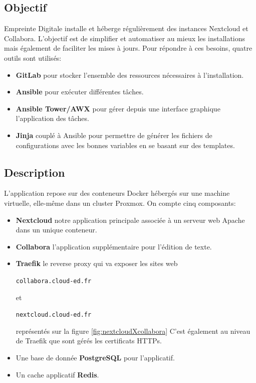 \documentclass[12pt, a4paper, twoside]{article}
\begin{document}
\subsection{Objectif}
Empreinte Digitale installe et héberge régulièrement des instances \gls{Nextcloud} et \gls{Collabora}. 
L'objectif est de simplifier et automatiser au mieux les installations mais également de faciliter les mises à jours.
Pour répondre à ces besoins, quatre outils sont utilisés:
\begin{itemize}
    \item \textbf{\gls{GitLab}} pour stocker l'ensemble des ressources nécessaires à l'installation.
    \item \textbf{\gls{Ansible}} pour exécuter différentes tâches.
    \item \textbf{\gls{Ansible} Tower/AWX} pour gérer depuis une interface graphique l'application des tâches.
    \item \textbf{\gls{Jinja}} couplé à \gls{Ansible} pour permettre de générer les fichiers de configurations avec les bonnes variables en se basant sur des templates.
\end{itemize}

\subsection{Description}
L'application repose sur des conteneurs Docker hébergés sur une machine virtuelle, elle-même dans un \gls{cluster} \gls{Proxmox}. On compte cinq composants:
\begin{itemize}
    \item \textbf{\gls{Nextcloud}} notre application principale associée à un serveur web Apache dans un unique conteneur.
    \item \textbf{\gls{Collabora}} l'application supplémentaire pour l'édition de texte.
    \item \textbf{\gls{Traefik}} le reverse proxy qui va exposer les sites web \begin{code}\texttt{collabora.cloud-ed.fr}\end{code} et \begin{code}\texttt{nextcloud.cloud-ed.fr}\end{code} représentés sur la figure \ref{fig:nextcloudXcollabora}
    C'est également au niveau de \gls{Traefik} que sont gérés les certificats HTTPs.
    \item Une base de donnée \textbf{PostgreSQL} pour l'applicatif.
    \item Un cache applicatif \textbf{Redis}.
\end{itemize}
\end{document}
